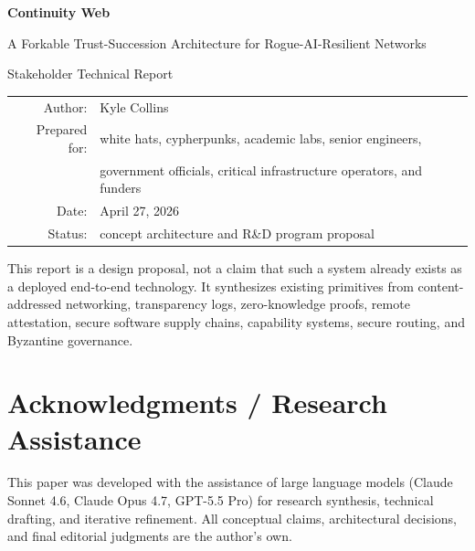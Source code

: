 \documentclass[11pt,letterpaper]{article}
\begin{document}
\begin{titlepage}
\centering
\vspace*{0.5in}
{\Huge\bfseries Continuity Web\par}
\vspace{0.25in}
{\Large A Forkable Trust-Succession Architecture for Rogue-AI-Resilient Networks\par}
\vspace{0.35in}
{\large Stakeholder Technical Report\par}
\vspace{0.6in}
\begin{tabular}{rl}
Author: & Kyle Collins \\[0.35em]
Prepared for: & white hats, cypherpunks, academic labs, senior engineers, \\
& government officials, critical infrastructure operators, and funders \\
Date: & April 27, 2026 \\
Status: & concept architecture and R\&D program proposal \\
\end{tabular}
\vfill
{}
\vfill
{\small This report is a design proposal, not a claim that such a system already exists as a deployed end-to-end technology. It synthesizes existing primitives from content-addressed networking, transparency logs, zero-knowledge proofs, remote attestation, secure software supply chains, capability systems, secure routing, and Byzantine governance.}
\end{titlepage}


\section*{Acknowledgments / Research Assistance}
This paper was developed with the assistance of large language models (Claude Sonnet 4.6, Claude Opus 4.7, GPT-5.5 Pro) for research synthesis, technical drafting, and iterative refinement. All conceptual claims, architectural decisions, and final editorial judgments are the author's own.
\end{document}
